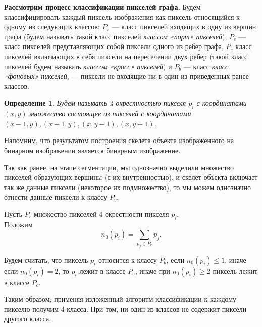 \documentclass[makeidx, a4paper, 14pt]{extarticle}
\newtheorem{definition}{Определение}
\begin{document}
\textbf{Рассмотрим процесс классификации пикселей графа.} Будем классифицировать каждый пиксель изображения как пиксель относящийся к одному из
следующих классов: $P_v$ --- класс пикселей входящих в одну из вершин графа (будем называть такой класс пикселей \emph{классом «порт» пикселей}),
$P_e$ --- класс пикселей представляющих собой пиксели одного из ребер графа, $P_c$ класс пикселей включающих в себя пиксели на пересечении двух ребер
(такой класс пикселей будем называть \emph{классом «кросс» пикселей}) и $P_b$ --- класс \emph{класс «фоновых» пикселей}, --- пиксели не входящие ни в один из приведенных ранее классов.

\begin{definition}
    Будем называть 4-окрестностью пикселя ${p_i}$ с координатами ${(x, y)}$ множество состоящее из пикселей с координатами
    ${(x-1, y), (x+1, y), (x, y-1), (x, y+1)}$.
\end{definition}

Напомним, что результатом построения скелета объекта изображенного на бинарном изображении является бинарным изображение.

Так как ранее, на этапе сегментации, мы однозначно выделили множество пикселей образующих вершины (с их внутренностью),
и скелет объекта включает так же данные пиксели (некоторое их подмножество), то мы можем однозначно отнести данные пиксели к классу $P_v$.

Пусть $P_r$ множество пикселей 4-окрестности пикселя $p_i$. \\
Положим \[
    n_0(p_i) = \sum_{p_j \in P_r} p_j.
\]

Будем считать, что пиксель $p_i$ относится к классу $P_b$, если $n_0(p_i) \le 1$, иначе если $n_0(p_i)=2$, то $p_i$ лежит в классе $P_e$,
иначе при $n_0(p_i) \ge 2$ пиксель лежит в классе $P_c$.

Таким образом, применяя изложенный алгоритм классификации к каждому пикселю получим 4 класса. При том, ни один из классов не содержит пиксели другого класса.
\end{document}
